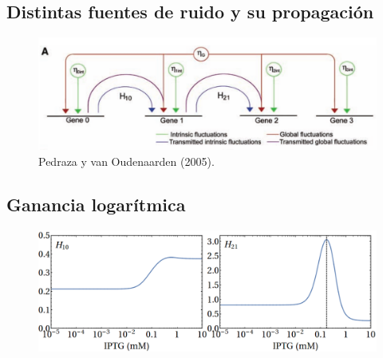 \documentclass[xcolor=dvipsnames]{beamer}
\begin{document}
\subsection{Distintas fuentes de ruido y su propagaci\'on}
\begin{frame}
\begin{figure}[p]
    \centering
    \includegraphics[width=\textwidth]{globalint.png}\\
    \tiny Pedraza y van Oudenaarden (2005).
\end{figure}
\end{frame}


\subsection{Ganancia logar\'itmica}
\begin{frame}
\begin{figure}[p]
    \centering
    \includegraphics[width=\textwidth]{lan-Hs.png}\\
\end{figure}
\end{frame}
\end{document}
